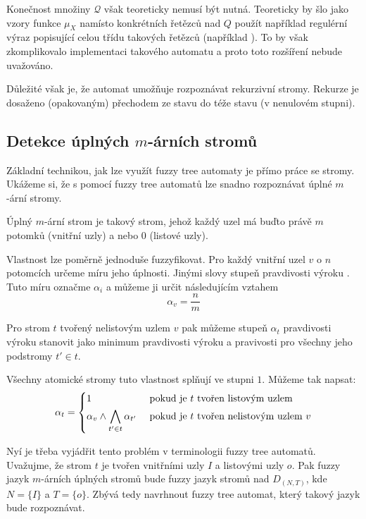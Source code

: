 \documentclass[a4paper,10pt]{article}
\begin{document}
Konečnost množiny $\mathcal{Q}$ však teoreticky nemusí být nutná. Teoreticky by šlo jako vzory funkce $\mu_X$ namísto konkrétních řetězců nad $Q$ použít například regulérní výraz popisující celou třídu takových řetězců (například ). To by však zkomplikovalo implementaci takového automatu a proto toto rozšíření nebude uvažováno.

Důležité však je, že automat umožňuje rozpoznávat rekurzivní stromy. Rekurze je dosaženo (opakovaným) přechodem ze stavu do téže stavu (v nenulovém stupni). 

\subsection{Detekce úplných $m$-árních stromů}
Základní technikou, jak lze využít fuzzy tree automaty je přímo práce se stromy. Ukážeme si, že s pomocí fuzzy tree automatů lze snadno rozpoznávat úplné $m$-ární stromy. 

\begin{definition}
 Úplný $m$-ární strom je takový strom, jehož každý uzel má buďto právě $m$ potomků (vnitřní uzly) a nebo $0$ (listové uzly).
\end{definition}

Vlastnost  lze poměrně jednoduše fuzzyfikovat. Pro každý vnitřní uzel $v$ o $n$ potomcích určeme míru jeho úplnosti. Jinými slovy stupeň pravdivosti výroku . Tuto míru označme $\alpha_i$ a můžeme ji určit následujícím vztahem
$$
  \alpha_v = \frac{n}{m}
$$

Pro strom $t$ tvořený nelistovým uzlem $v$ pak můžeme stupeň $\alpha_t$ pravdivosti výroku  stanovit jako minimum pravdivosti výroku  a pravivosti  pro všechny jeho podstromy $t' \in t$.

Všechny atomické stromy tuto vlastnost splňují ve stupni $1$. Můžeme tak napsat:
$$
  \alpha_t = 
    \begin{dcases}
      1 				& \text{ pokud je $t$ tvořen listovým uzlem} \\
      \alpha_v \wedge \bigwedge_{t' \in t} \alpha_{t'} 	& \text{ pokud je $t$ tvořen nelistovým uzlem $v$}
    \end{dcases}
$$

Nyí je třeba vyjádřit tento problém v terminologii fuzzy tree automatů. Uvažujme, že strom $t$ je tvořen vnitřními uzly $I$ a listovými uzly $o$. Pak fuzzy jazyk $m$-árních úplných stromů bude fuzzy jazyk stromů nad $D_{(N,T)}$, kde $N = \{ I \}$ a $T = \{ o \}$. Zbývá tedy navrhnout fuzzy tree automat, který takový jazyk bude rozpoznávat.
\end{document}
